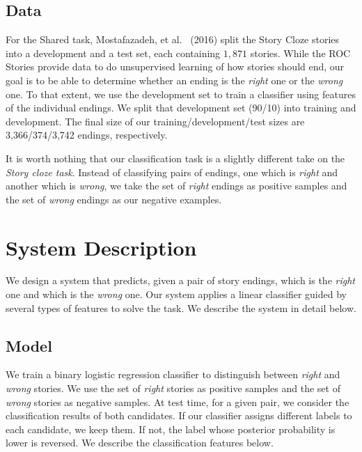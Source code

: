 \documentclass[11pt]{article}
\begin{document}
{\subsection{Data}
For the Shared task, Mostafazadeh, et al. ~(2016)\nocite{Mostafazadeh:2016} split the Story Cloze stories into a development and a test set, each containing $1,871$ stories.
While the ROC Stories provide data to do unsupervised learning of how stories should end, our goal is to be able to determine whether an ending is the \textit{right} one or the \textit{wrong} one. To that extent, we use the development set to train a classifier using features of the individual endings. We split that development set (90/10) into training and development.
The final size of our training/development/test sizes are 3,366/374/3,742 endings, respectively. 

It is worth nothing that our classification task is a slightly different take on the {\it Story cloze task}. 
Instead of classifying pairs of endings, one which is {\it right} and another which is {\it wrong}, we take the set of  {\it right} endings as positive samples and the set of {\it wrong} endings as our negative examples. 
}

\section{System Description}
We design a system that predicts, given a pair of story endings, which is the  \textit{right} one and which is the \textit{wrong} one.
Our system applies a linear classifier guided by several types of features to solve the task.
We describe the system in detail below.

\subsection{Model}
We train a binary logistic regression classifier to distinguish between {\it right} and {\it wrong} stories. 
We use the set of {\it right} stories as positive samples and the set of {\it wrong} stories as negative samples.
At test time, for a given pair, we consider the classification results of both candidates. 
If our classifier assigns different labels to each candidate, we keep them.  
If not, the label whose posterior probability is lower is reversed.
We describe the classification features below.
\end{document}
